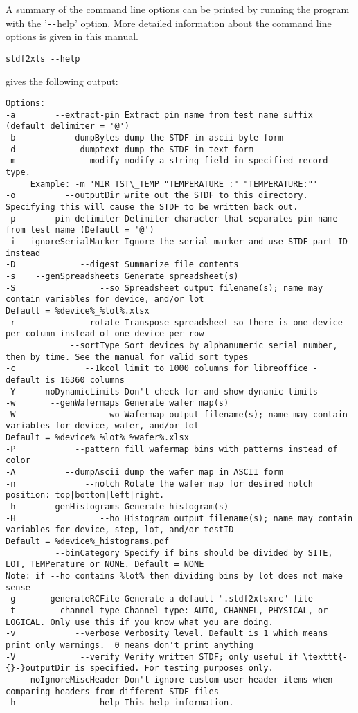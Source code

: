 \documentclass[letterpaper]{article}
\begin{document}
A summary of the command line options can be printed by running the program
with the '\texttt{-{}-}help' option.  More detailed information about the command line
options is given in this manual.
\begin{verbatim}
stdf2xls --help
\end{verbatim}
gives the following output:
\begingroup
\scriptsize
\begin{verbatim}
Options:
-a        --extract-pin Extract pin name from test name suffix (default delimiter = '@')
-b          --dumpBytes dump the STDF in ascii byte form
-d           --dumptext dump the STDF in text form
-m             --modify modify a string field in specified record type.
     Example: -m 'MIR TST\_TEMP "TEMPERATURE :" "TEMPERATURE:"'
-o          --outputDir write out the STDF to this directory. Specifying this will cause the STDF to be written back out.
-p      --pin-delimiter Delimiter character that separates pin name from test name (Default = '@')
-i --ignoreSerialMarker Ignore the serial marker and use STDF part ID instead
-D             --digest Summarize file contents
-s    --genSpreadsheets Generate spreadsheet(s)
-S                 --so Spreadsheet output filename(s); name may contain variables for device, and/or lot
Default = %device%_%lot%.xlsx
-r             --rotate Transpose spreadsheet so there is one device per column instead of one device per row
             --sortType Sort devices by alphanumeric serial number, then by time. See the manual for valid sort types
-c              --1kcol limit to 1000 columns for libreoffice - default is 16360 columns
-Y    --noDynamicLimits Don't check for and show dynamic limits
-w       --genWafermaps Generate wafer map(s)
-W                 --wo Wafermap output filename(s); name may contain variables for device, wafer, and/or lot
Default = %device%_%lot%_%wafer%.xlsx
-P            --pattern fill wafermap bins with patterns instead of color
-A          --dumpAscii dump the wafer map in ASCII form
-n              --notch Rotate the wafer map for desired notch position: top|bottom|left|right.
-h      --genHistograms Generate histogram(s)
-H                 --ho Histogram output filename(s); name may contain variables for device, step, lot, and/or testID
Default = %device%_histograms.pdf
          --binCategory Specify if bins should be divided by SITE, LOT, TEMPerature or NONE. Default = NONE
Note: if --ho contains %lot% then dividing bins by lot does not make sense
-g     --generateRCFile Generate a default ".stdf2xlsxrc" file
-t       --channel-type Channel type: AUTO, CHANNEL, PHYSICAL, or LOGICAL. Only use this if you know what you are doing.
-v            --verbose Verbosity level. Default is 1 which means print only warnings.  0 means don't print anything
-V             --verify Verify written STDF; only useful if \texttt{-{}-}outputDir is specified. For testing purposes only.
   --noIgnoreMiscHeader Don't ignore custom user header items when comparing headers from different STDF files
-h               --help This help information.
\end{verbatim}
\endgroup
\end{document}

